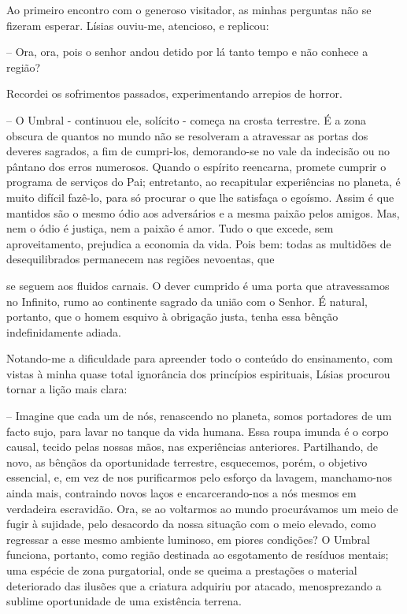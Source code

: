 \documentclass[portuguese,12pt,a4paper]{scrbook}
\begin{document}
	Ao primeiro encontro com o generoso visitador, as minhas perguntas não se fizeram esperar. Lísias ouviu-me, atencioso, e replicou:
	
	– Ora, ora, pois o senhor andou detido por lá tanto tempo e não conhece a região?
	
	Recordei os sofrimentos passados, experimentando arrepios de horror.
	
	– O Umbral - continuou ele, solícito - começa na crosta terrestre. É a zona obscura de quantos no mundo não se resolveram a atravessar as portas dos deveres sagrados, a fim de cumpri-los, demorando-se no vale da indecisão ou no pântano dos erros numerosos. Quando o espírito reencarna, promete cumprir o programa de serviços do Pai; entretanto, ao recapitular experiências no planeta, é muito difícil fazê-lo, para só procurar o que lhe satisfaça o egoísmo. Assim é que mantidos são o mesmo ódio aos adversários e a mesma paixão pelos amigos. Mas, nem o ódio é justiça, nem a paixão é amor. Tudo o que excede, sem aproveitamento, prejudica a economia da vida. Pois bem: todas as multidões de desequilibrados permanecem nas regiões nevoentas, que
	
	
	se seguem aos fluidos carnais. O dever cumprido é uma porta que atravessamos no Infinito, rumo ao continente sagrado da união com o Senhor. É natural, portanto, que o homem esquivo à obrigação justa, tenha essa bênção indefinidamente adiada.
	
	Notando-me a dificuldade para apreender todo o conteúdo do ensinamento, com vistas à minha quase total ignorância dos princípios espirituais, Lísias procurou tornar a lição mais clara:
	
	– Imagine que cada um de nós, renascendo no planeta, somos portadores de um facto sujo, para lavar no tanque da vida humana. Essa roupa imunda é o corpo causal, tecido pelas nossas mãos, nas experiências anteriores. Partilhando, de novo, as bênçãos da oportunidade terrestre, esquecemos, porém, o objetivo essencial, e, em vez de nos purificarmos pelo esforço da lavagem, manchamo-nos ainda mais, contraindo novos laços e encarcerando-nos a nós mesmos em verdadeira escravidão. Ora, se ao voltarmos ao mundo procurávamos um meio de fugir à sujidade, pelo desacordo da nossa situação com o meio elevado, como regressar a esse mesmo ambiente luminoso, em piores condições? O Umbral funciona, portanto, como região destinada ao esgotamento de resíduos mentais; uma espécie de zona purgatorial, onde se queima a prestações o material deteriorado das ilusões que a criatura adquiriu por atacado, menosprezando a sublime oportunidade de uma existência terrena.
	
\end{document}
